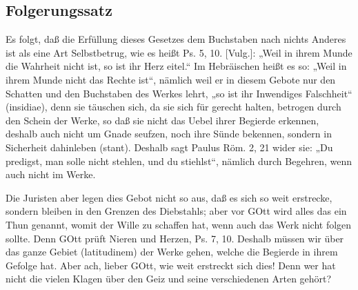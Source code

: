 \subsection{Folgerungssatz}

Es folgt, daß die Erfüllung dieses Gesetzes dem Buchstaben nach nichts Anderes ist als eine Art Selbstbetrug, wie es heißt Ps. 5, 10. [Vulg.]: „Weil in ihrem Munde die Wahrheit nicht ist, so ist ihr Herz eitel.“ Im Hebräischen heißt es so: „Weil in ihrem Munde nicht das Rechte ist“, nämlich weil er in diesem Gebote nur den Schatten und den Buchstaben des Werkes lehrt, „so ist ihr Inwendiges Falschheit“ (insidiae), denn sie täuschen sich, da sie sich für gerecht halten, betrogen durch den Schein der Werke, so daß sie nicht das Uebel ihrer Begierde erkennen, deshalb auch nicht um Gnade seufzen, noch ihre Sünde bekennen, sondern in Sicherheit dahinleben (stant). Deshalb sagt Paulus Röm. 2, 21 wider sie: „Du predigst, man solle nicht stehlen, und du stiehlst“, nämlich durch Begehren, wenn auch nicht im Werke.

Die Juristen aber legen dies Gebot nicht so aus, daß es sich so weit erstrecke, sondern bleiben in den Grenzen des Diebstahls; aber vor GOtt wird alles das ein Thun genannt, womit der Wille zu schaffen hat, wenn auch das Werk nicht folgen sollte. Denn GOtt prüft Nieren und Herzen, Ps. 7, 10. Deshalb müssen wir über das ganze Gebiet (latitudinem) der Werke gehen, welche die Begierde in ihrem Gefolge hat. Aber ach, lieber GOtt, wie weit erstreckt sich dies! Denn wer hat nicht die vielen Klagen über den Geiz und seine verschiedenen Arten gehört?

